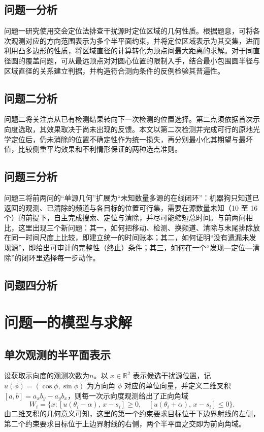 \documentclass[UTF8,a4paper,zihao=-4,fontset=none]{ctexart}
\begin{document}
\subsection{问题一分析}

问题一研究使用交会定位法排查干扰源时定位区域的几何性质。根据题意，可将各次观测对应的方向范围表示为多个半平面约束，并将定位区域表示为其交集，进而利用凸多边形的性质，将区域直径的计算转化为顶点间最大距离的求解。对于同直径圆的覆盖问题，可从最远顶点对对圆心位置的限制入手，结合最小包围圆半径与区域直径的关系建立判据，并构造符合测向条件的反例检验其普遍性。

\subsection{问题二分析}

问题二将关注点从已有检测结果转向下一次检测的位置选择。第二点须依据首次示向度选取，其效果取决于尚未出现的反馈。本文以第二次检测并完成可行的原地光学定位后，仍未消除的位置不确定性作为统一损失，再分别最小化其期望与最坏值，比较侧重平均效果和不利情形保证的两种选点准则。
\subsection{问题三分析}

问题三将前两问的“单源几何”扩展为“未知数量多源的在线闭环”：机器狗只知道已返回的观测、已清除的频道与各目标的位置可行集，需要在源数量未知（10 至 16 个）的前提下，自主完成搜索、定位与清除，并尽可能缩短总时间。与前两问相比，这里出现三个新问题：其一，如何把移动、检测、换频道、清除与末尾排除放在同一时间尺度上比较，即建立统一的时间账本；其二，如何证明“没有遗漏未发现源”，即给出可审计的完整性（终止）条件；其三，如何在一个“发现—定位—清除”的闭环里选择每一步动作。

\subsection{问题四分析}


\section{问题一的模型与求解}

\subsection{单次观测的半平面表示}

设获取示向度的观测次数为$n$。以 \(x\in\mathbb R^2\) 表示候选干扰源位置，记 \(u(\phi)=(\cos\phi,\sin\phi)\) 为方向角 \(\phi\) 对应的单位向量，并定义二维叉积 \([a,b]=a_xb_y-a_yb_x\)，则每一次示向度观测给出了正向角域
\begin{equation}
  W_i=\{x:[u(\theta_i-\alpha),\,x-s_i]\ge0,\quad [u(\theta_i+\alpha),\,x-s_i]\le0\}.
  \label{eq:wedge}
\end{equation}
由二维叉积的几何意义可知，这里的第一个约束要求目标位于下边界射线的左侧，第二个约束要求目标位于上边界射线的右侧，两个半平面之交即为前向角域。
\end{document}
